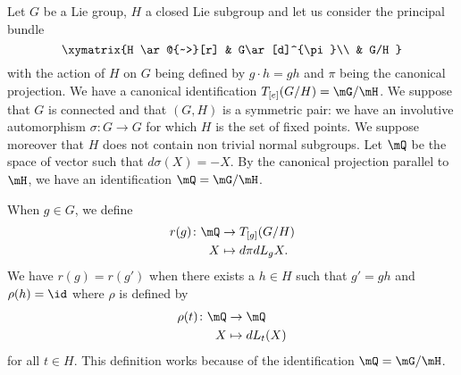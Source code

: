 Let $G$ be a Lie group, $H$ a closed Lie subgroup and let us consider the principal bundle
\begin{equation}
\xymatrix{%
   H \ar@{~>}[r]		&	G\ar[d]^{\pi}\\
   				&	G/H
 }
\end{equation}
with the action of $H$ on $G$ being defined by $g\cdot h=gh$ and $\pi$ being the canonical projection. We have a canonical identification $T_{[e]}(G/H)=\mG/\mH$. We suppose that $G$ is connected and that $(G,H)$ is a symmetric pair: we have an involutive automorphism $\sigma\colon G\to G$ for which $H$ is the set of fixed points. We suppose moreover that $H$ does not contain non trivial normal subgroups. Let $\mQ$ be the space of vector such that $d\sigma(X)=-X$. By the canonical projection parallel to $\mH$, we have an identification $\mQ=\mG/\mH$.

When $g\in G$, we define
\begin{equation}
\begin{aligned}
 r(g)\colon \mQ&\to T_{[g]}(G/H) \\ 
  X&\mapsto d\pi dL_gX.
\end{aligned}
\end{equation}
We have $r(g)=r(g')$ when there exists a $h\in H$ such that $g'=gh$ and $\rho(h)=\id$ where $\rho$ is defined by
\begin{equation}
\begin{aligned}
 \rho(t)\colon \mQ&\to \mQ \\ 
  X&\mapsto dL_t(X) 
\end{aligned}
\end{equation}
for all $t\in H$. This definition works because of the identification $\mQ=\mG/\mH$.

